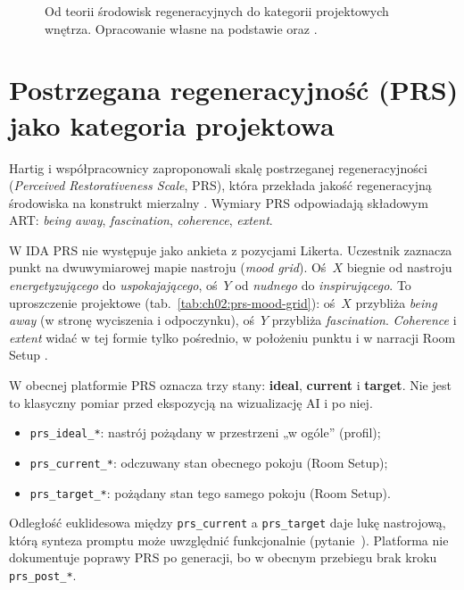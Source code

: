 \begin{figure}[htbp]
  \centering
  \caption{Od teorii środowisk regeneracyjnych do kategorii projektowych wnętrza.
    Opracowanie własne na podstawie \textcite{kaplan1995restorative} oraz \textcite{ulrich1984window}.}
  \label{fig:ch02:restorative-framework}
\end{figure}

\section{Postrzegana regeneracyjność (PRS) jako kategoria projektowa}
\label{ch02:sec:prs}

Hartig i współpracownicy zaproponowali skalę postrzeganej regeneracyjności (\emph{Perceived Restorativeness Scale}, PRS), która przekłada jakość regeneracyjną środowiska na konstrukt mierzalny \parencite{hartig1997prs}.
Wymiary PRS odpowiadają składowym ART: \emph{being away}, \emph{fascination}, \emph{coherence}, \emph{extent}.

W IDA PRS nie występuje jako ankieta z pozycjami Likerta. Uczestnik zaznacza punkt na dwuwymiarowej mapie nastroju (\emph{mood grid}).
Oś~$X$ biegnie od nastroju \emph{energetyzującego} do \emph{uspokajającego}, oś~$Y$ od \emph{nudnego} do \emph{inspirującego}.
To uproszczenie projektowe (tab.~\ref{tab:ch02:prs-mood-grid}): oś~$X$ przybliża \emph{being away} (w stronę wyciszenia i odpoczynku), oś~$Y$ przybliża \emph{fascination}. \emph{Coherence} i \emph{extent} widać w tej formie tylko pośrednio, w położeniu punktu i w narracji Room Setup \parencite{idaPlatform2026}.

W obecnej platformie PRS oznacza trzy stany: \textbf{ideal}, \textbf{current} i \textbf{target}. Nie jest to klasyczny pomiar przed ekspozycją na wizualizację AI i po niej.
\begin{itemize}
  \item \texttt{prs\_ideal\_*}: nastrój pożądany w przestrzeni „w ogóle” (profil);
  \item \texttt{prs\_current\_*}: odczuwany stan obecnego pokoju (Room Setup);
  \item \texttt{prs\_target\_*}: pożądany stan tego samego pokoju (Room Setup).
\end{itemize}
Odległość euklidesowa między \texttt{prs\_current} a \texttt{prs\_target} daje lukę nastrojową, którą synteza promptu może uwzględnić funkcjonalnie (pytanie~).
Platforma nie dokumentuje poprawy PRS po generacji, bo w obecnym przebiegu brak kroku \texttt{prs\_post\_*}.

